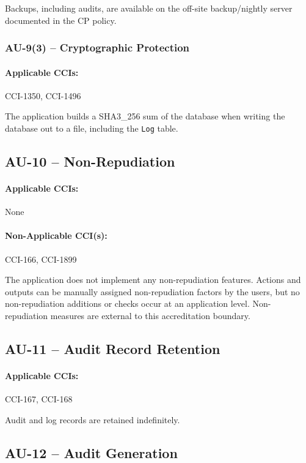 \documentclass[letterpaper, 10pt, twoside]{article}
\begin{document}
Backups, including audits, are available on the off-site backup/nightly server documented in the CP policy.

\subsubsection{AU-9(3) -- Cryptographic Protection}

\paragraph{Applicable CCIs:} CCI-1350, CCI-1496

The application builds a SHA3\_256 sum of the database when writing the database out to a file, including the \texttt{Log} table.

\subsection{AU-10 -- Non-Repudiation}

\paragraph{Applicable CCIs:} None

\paragraph{Non-Applicable CCI(s):} CCI-166, CCI-1899

The application does not implement any non-repudiation features. Actions and outputs can be manually assigned non-repudiation factors by the users, but no non-repudiation additions or checks occur at an application level. Non-repudiation measures are external to this accreditation boundary.

\subsection{AU-11 -- Audit Record Retention}

\paragraph{Applicable CCIs:} CCI-167, CCI-168

Audit and log records are retained indefinitely.

\subsection{AU-12 -- Audit Generation}
\end{document}
